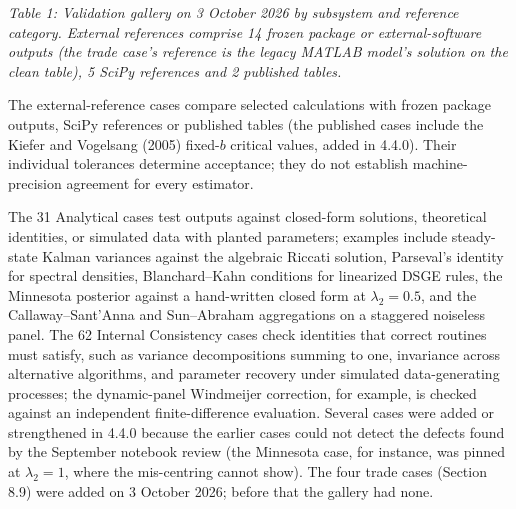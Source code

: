 \documentclass[11pt,letterpaper]{article}
\newcounter{none} %
\renewcommand{\_}{\pmunderscore\allowbreak}
\begin{document}
\emph{Table 1: Validation gallery on 3 October 2026 by subsystem and reference category. External references comprise 14 frozen package or external-software outputs (the trade case's reference is the legacy MATLAB model's solution on the clean table), 5 SciPy references and 2 published tables.}

The external-reference cases compare selected calculations with frozen package outputs, SciPy references or published tables (the published cases include the Kiefer and Vogelsang (2005) fixed-\(b\) critical values, added in 4.4.0). Their individual tolerances determine acceptance; they do not establish machine-precision agreement for every estimator.

The 31 Analytical cases test outputs against closed-form solutions, theoretical identities, or simulated data with planted parameters; examples include steady-state Kalman variances against the algebraic Riccati solution, Parseval's identity for spectral densities, Blanchard--Kahn conditions for linearized DSGE rules, the Minnesota posterior against a hand-written closed form at \(\lambda_2 = 0.5\), and the Callaway--Sant'Anna and Sun--Abraham aggregations on a staggered noiseless panel. The 62 Internal Consistency cases check identities that correct routines must satisfy, such as variance decompositions summing to one, invariance across alternative algorithms, and parameter recovery under simulated data-generating processes; the dynamic-panel Windmeijer correction, for example, is checked against an independent finite-difference evaluation. Several cases were added or strengthened in 4.4.0 because the earlier cases could not detect the defects found by the September notebook review (the Minnesota case, for instance, was pinned at \(\lambda_2 = 1\), where the mis-centring cannot show). The four trade cases (Section 8.9) were added on 3 October 2026; before that the gallery had none.
\end{document}
